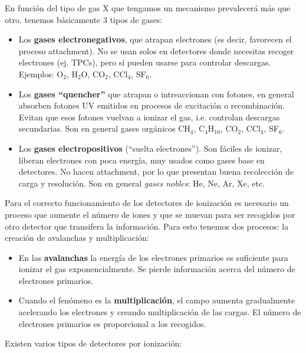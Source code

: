 En función del tipo de gas X que tengamos un mecanismo prevalecerá más que otro. tenemos básicamente 3 tipos de gases:

\begin{itemize}
    \item   Los \textbf{gases electronegativos}, que atrapan electrones (es decir, favorecen el proceso attachment). No se usan solos en detectores donde necesitas recoger electrones (ej. TPCs), pero sí pueden usarse para controlar descargas. Ejemplos: O$_2$,  H$_2$O, CO$_2$, CCl$_4$, SF$_6$.
    \item Los \textbf{gases ``quencher''} que atrapan o intreaccionan con fotones, en general  absorben fotones UV emitidos en procesos de excitación o recombinación. Evitan que esos fotones vuelvan a ionizar el gas, i.e. controlan descargas secundarias. Son en general gases orgánicos CH$_4$, C$_4$H$_{10}$, CO$_2$, CCl$_4$, SF$_6$. 
    \item Los \textbf{gases electropositivos} (``suelta electrones''). Son fáciles de ionizar, liberan electrones con poca energía, muy usados como gases base en detectores. No hacen attachment, por lo que presentan buena recolección de carga y resolución. Son en general \textit{gases nobles}: He, Ne, Ar, Xe, etc.
\end{itemize}   

Para el correcto funcionamiento de los detectores de ionización es necesario un proceso que aumente el número de iones y que se muevan para ser recogidos por otro detector que transifera la información. Para esto tenemos dos procesos: la creación de avalanchas y multiplicación:

\begin{itemize}
    \item En las \textbf{avalanchas} la energía de los electrones primarios es suficiente para ionizar el gas exponencialmente. Se pierde información acerca del número de electrones primarios.
    \item Cuando el fenómeno es la \textbf{multiplicación}, el campo aumenta gradualmente acelerando los electrones y creando multiplicación de las cargas. El número de electrones primarios es proporcional a los recogidos. 
\end{itemize}

Existen varios tipos de detectores por ionización: 

